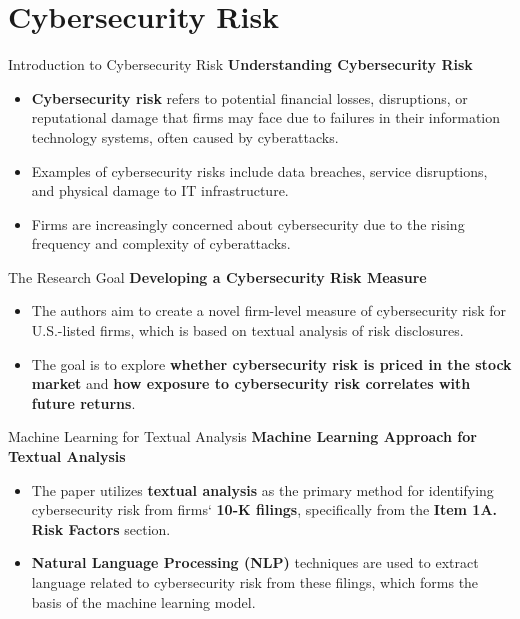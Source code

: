 \documentclass[11pt]{beamer}
\newcommand{\hly}[1]{\colorbox{yellow!100}{#1}}
\newcommand{\hlg}[1]{\colorbox{green!100}{#1}}
\begin{document}
\section{Cybersecurity Risk \\ }
\begin{frame}{Introduction to Cybersecurity Risk}
\textbf{Understanding Cybersecurity Risk}

	\begin{itemize}
		\item \textbf{Cybersecurity risk} refers to potential financial losses, disruptions, or reputational damage that firms may face due to failures in their information technology systems, often caused by cyberattacks.

		\item Examples of cybersecurity risks include data breaches, service disruptions, and physical damage to IT infrastructure.

		\item Firms are increasingly concerned about cybersecurity due to the rising frequency and complexity of cyberattacks.

	\end{itemize}
\end{frame}
\begin{frame}{The Research Goal}
\textbf{Developing a Cybersecurity Risk Measure}

	\begin{itemize}
		\item The authors aim to create a novel \hly{firm-level} measure of cybersecurity risk for U.S.-listed firms, which is based on textual analysis of \hlg{risk disclosures}.

		\item The goal is to explore \textbf{whether cybersecurity risk is priced in the stock market} and \textbf{how exposure to cybersecurity risk correlates with future returns}.

	\end{itemize}
\end{frame}
\begin{frame}{Machine Learning for Textual Analysis}
\textbf{Machine Learning Approach for Textual Analysis}

	\begin{itemize}
		\item The paper utilizes \textbf{textual analysis} as the primary method for identifying cybersecurity risk from firms` \textbf{10-K filings}, specifically from the \textbf{Item 1A. Risk Factors} section.

		\item \textbf{Natural Language Processing (NLP)} techniques are used to extract language related to cybersecurity risk from these filings, which forms the basis of the machine learning model.

	\end{itemize}
\end{frame}
\end{document}

